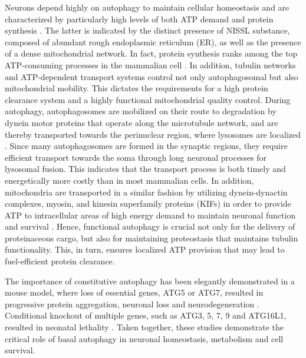 Neurons depend highly on autophagy to maintain cellular homeostasis and are characterized by particularly high levels of both ATP demand and protein synthesis \citep{Meijer2009,Son2012}. The latter is indicated by the distinct presence of NISSL substance, composed of abundant rough endoplasmic reticulum (ER), as well as the presence of a dense mitochondrial network. In fact, protein synthesis ranks among the top ATP-consuming processes in the mammalian cell 
\citep{Buttgereit1995}. In addition, tubulin networks and ATP-dependent transport systems control not only autophagosomal but also mitochondrial mobility. This dictates the requirements for a high protein clearance system and a highly functional mitochondrial quality control. During autophagy, autophagosomes are mobilized on their route to degradation by dynein motor proteins that operate along the microtubule network, and are thereby transported towards the perinuclear region, where lysosomes are localized \citep{Fass2006,Jahreiss2008,Kimura2008}. Since many autophagosomes are formed in the synaptic regions, they require efficient transport towards the soma through long neuronal processes for lysosomal fusion. This indicates that the transport process is both timely and energetically more costly than in most mammalian cells. In addition, mitochondria are transported in a similar fashion by utilizing dynein-dynactin complexes, myosin, and kinesin superfamily proteins (KIFs) in order to provide ATP to intracellular areas of high energy demand to maintain neuronal function and survival \citep{Lin2015,Sheng2012}. Hence, functional autophagy is crucial not only for the delivery of proteinaceous cargo, but also for maintaining proteostasis that maintains tubulin functionality. This, in turn, ensures localized ATP provision that may lead to fuel-efficient protein clearance. 

The importance of constitutive autophagy has been elegantly demonstrated in a mouse model, where loss of essential genes, ATG5 or ATG7, resulted in progressive protein aggregation, neuronal loss and neurodegeneration \citep{Hara2006,Komatsu2006}. Conditional knockout of multiple genes, such as ATG3, 5, 7, 9 and ATG16L1, resulted in neonatal lethality \citep{Mizushima2010}. Taken together, these studies demonstrate the critical role of basal autophagy in neuronal homeostasis, metabolism and cell survival. 

